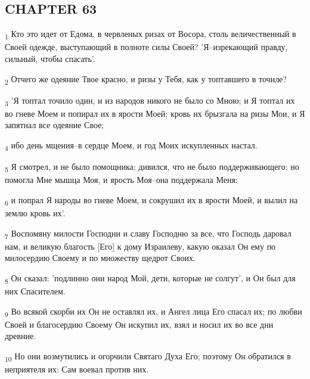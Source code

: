 \subsection{CHAPTER 63}
\begin{tcolorbox}
\textsubscript{1} Кто это идет от Едома, в червленых ризах от Восора, столь величественный в Своей одежде, выступающий в полноте силы Своей? 'Я--изрекающий правду, сильный, чтобы спасать'.
\end{tcolorbox}
\begin{tcolorbox}
\textsubscript{2} Отчего же одеяние Твое красно, и ризы у Тебя, как у топтавшего в точиле?
\end{tcolorbox}
\begin{tcolorbox}
\textsubscript{3} 'Я топтал точило один, и из народов никого не было со Мною; и Я топтал их во гневе Моем и попирал их в ярости Моей; кровь их брызгала на ризы Мои, и Я запятнал все одеяние Свое;
\end{tcolorbox}
\begin{tcolorbox}
\textsubscript{4} ибо день мщения--в сердце Моем, и год Моих искупленных настал.
\end{tcolorbox}
\begin{tcolorbox}
\textsubscript{5} Я смотрел, и не было помощника; дивился, что не было поддерживающего; но помогла Мне мышца Моя, и ярость Моя--она поддержала Меня:
\end{tcolorbox}
\begin{tcolorbox}
\textsubscript{6} и попрал Я народы во гневе Моем, и сокрушил их в ярости Моей, и вылил на землю кровь их'.
\end{tcolorbox}
\begin{tcolorbox}
\textsubscript{7} Воспомяну милости Господни и славу Господню за все, что Господь даровал нам, и великую благость [Его] к дому Израилеву, какую оказал Он ему по милосердию Своему и по множеству щедрот Своих.
\end{tcolorbox}
\begin{tcolorbox}
\textsubscript{8} Он сказал: 'подлинно они народ Мой, дети, которые не солгут', и Он был для них Спасителем.
\end{tcolorbox}
\begin{tcolorbox}
\textsubscript{9} Во всякой скорби их Он не оставлял их, и Ангел лица Его спасал их; по любви Своей и благосердию Своему Он искупил их, взял и носил их во все дни древние.
\end{tcolorbox}
\begin{tcolorbox}
\textsubscript{10} Но они возмутились и огорчили Святаго Духа Его; поэтому Он обратился в неприятеля их: Сам воевал против них.
\end{tcolorbox}
